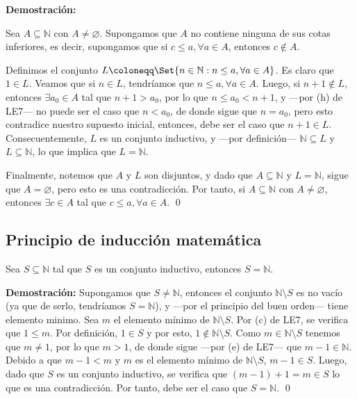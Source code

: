 \documentclass[11pt]{article}
\newcommand{\N}{\mathbb{N}}
\newcommand{\R}{\mathbb{R}}
\let\emptyset\varnothing
\let\set\Set
\begin{document}
\pagebreak

\textbf{Demostración:}

Sea $A\subseteq \N$ con $A\neq \emptyset$. Supongamos que $A$ no contiene ninguna de sus cotas inferiores, es decir, supongamos que si $c\leq a, \forall a\in A$, entonces $c\notin A$.

Definimos el conjunto $L\coloneqq \set{n\in \N: n\leq a, \forall a\in A}$. Es claro que $1\in L$. Veamos que si $n\in L$, tendríamos que $n\leq a, \forall a\in A$. Luego, si $n+1\notin L$, entonces $\exists a_0\in A$ tal que $n+1>a_0$, por lo que $n\leq a_0<n+1$, y —por (h) de LE7— no puede ser el caso que $n<a_0$, de donde sigue que $n=a_0$, pero esto contradice nuestro supuesto inicial, entonces, debe ser el caso que $n+1\in L$. Consecuentemente, $L$ es un conjunto inductivo, y —por definición— $\N\subseteq L$ y $L\subseteq \N$, lo que implica que $L=\N$.

Finalmente, notemos que $A$ y $L$ son disjuntos, y dado que $A\subseteq \N$ y $L=\N$, sigue que $A=\emptyset$, pero esto es una contradicción. Por tanto, si $A\subseteq \N$ con $A\neq \emptyset$, entonces $\exists c\in A$ tal que $c\leq a, \forall a\in A$. \qed
%
%
%
%
%

\subsection*{Principio de inducción matemática}

Sea $S\subseteq \N$ tal que $S$ es un conjunto inductivo, entonces $S=\N$.

\textbf{Demostración:} Supongamos que $S\neq \N$, entonces el conjunto $\N\setminus S$ es no vacío (ya que de serlo, tendríamos $S=\N$), y —por el principio del buen orden— tiene elemento minimo. Sea $m$ el elemento mínimo de $\N\setminus S$. Por (c) de LE7, se verifica que $1 \leq m$. Por definición, $1\in S$ y por esto, $1\notin \N\setminus S$. Como $m\in \N\setminus S$ tenemos que $m\neq 1$, por lo que $m>1$, de donde sigue —por (e) de LE7— que $m-1\in \N$. Debido a que $m-1<m$ y $m$ es el elemento mínimo de $\N \setminus S$, $m-1\in S$. Luego, dado que $S$ es un conjunto inductivo, se verifica que $(m-1)+1=m\in S$ lo que es una contradicción. Por tanto, debe ser el caso que $S=\N$. \qed
\end{document}
